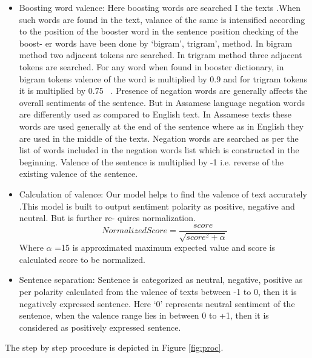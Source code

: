 \documentclass[conference]{IEEEtran}
\begin{document}
\begin{enumerate}
\begin{itemize}
                \item Boosting word valence: Here boosting words are searched I the texts .When such words are found in the text, valance of the same is intensified according to the position of the booster word in the sentence position checking of the boost- er words have been done by ‘bigram’, trigram’, method. In bigram method two adjacent tokens are searched. In trigram method three adjacent tokens are searched. For any word when found in booster dictionary, in bigram tokens valence of the word is multiplied by 0.9 and for trigram tokens it is multiplied by 0.75 ~\cite{b3}. Presence of negation words are generally affects the overall sentiments of the sentence. But in Assamese language negation words are differently used as compared to English text. In Assamese texts these words are used generally at the end of the sentence where as in English they are used in the middle of the texts. Negation words are searched as per the list of words included in the negation words list which is constructed in the beginning. Valence of the sentence is multiplied by -1 i.e. reverse of the existing valence of the sentence.

                \item Calculation of valence: Our model helps to find the valence of text accurately .This model is built to output sentiment polarity as positive, negative and neutral. But is further re- quires normalization.
                 \begin{equation}
                     Normalized Score =\frac{score}{\sqrt{score^2 + \alpha}}
                 \end{equation}
                Where $\alpha$ =15 is approximated maximum expected value and score is calculated score to be normalized.
                
                \item Sentence separation: Sentence is categorized as neutral, negative, positive as per polarity calculated from the valence of texts between -1 to 0, then it is negatively expressed sentence. Here ‘0’ represents neutral sentiment of the sentence, when the valence range lies in between 0 to +1, then it is considered as positively expressed sentence.
            \end{itemize}
            
\end{enumerate}
The step by step procedure is depicted in Figure \ref{fig:proc}.
\end{document}
